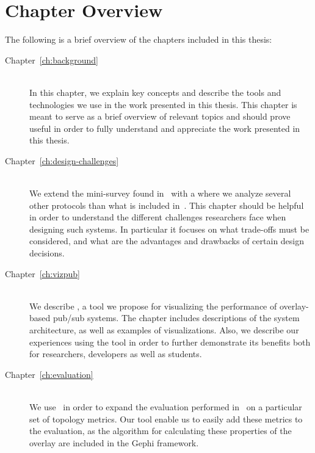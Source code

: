 \section{Chapter Overview}

The following is a brief overview of the chapters included in this
thesis:

\begin{description}
    \item[Chapter~\ref{ch:background}] \hfill \\

        In this chapter, we explain key concepts and describe the tools
        and technologies we use in the work presented in this thesis.
        This chapter is meant to serve as a brief overview of relevant
        topics and should prove useful in order to fully understand and
        appreciate the work presented in this thesis.

    \item[Chapter~\ref{ch:design-challenges}] \hfill \\

        We extend the mini-survey found in~\cite{Setty:2012} with a
        where we analyze several other protocols than what is included
        in~\cite{Setty:2012}. This chapter should be helpful in order to
        understand the different challenges researchers face when
        designing such systems. In particular it focuses on what
        trade-offs must be considered, and what are the advantages and
        drawbacks of certain design decisions.

    \item[Chapter~\ref{ch:vizpub}] \hfill \\

        We describe \demo, a tool we propose for visualizing the
        performance of overlay-based pub/sub systems. The chapter
        includes descriptions of the system architecture, as well as
        examples of visualizations. Also, we describe our experiences
        using the tool in order to further demonstrate its benefits both
        for researchers, developers as well as students.

    \item[Chapter~\ref{ch:evaluation}] \hfill \\

       We use \demo~in order to expand the evaluation performed
       in~\cite{Setty:2012} on a particular set of topology metrics. Our
       tool enable us to easily add these metrics to the evaluation, as
       the algorithm for calculating these properties of the overlay are
       included in the Gephi framework.


\end{description}
